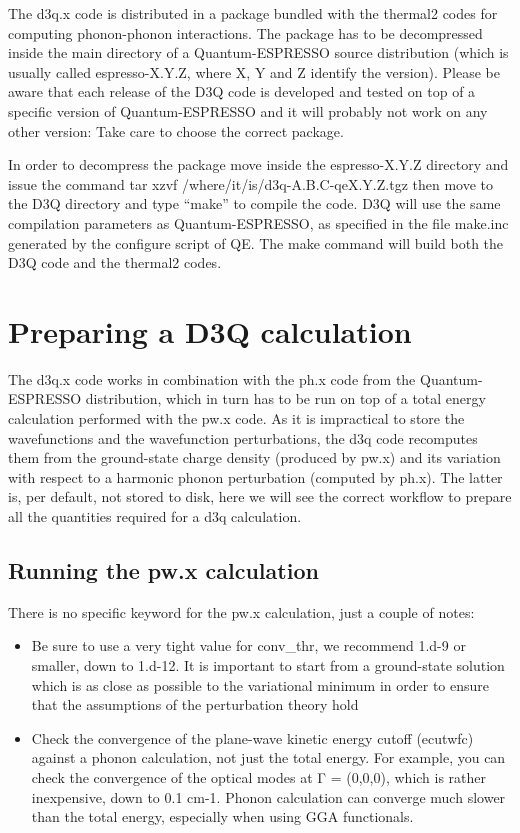 \documentclass[
]{article}
\providecommand{\tightlist}{%
  \setlength{\itemsep}{0pt}\setlength{\parskip}{0pt}}
\begin{document}
The d3q.x code is distributed in a package bundled with the thermal2
codes for computing phonon-phonon interactions. The package has to be
decompressed inside the main directory of a Quantum-ESPRESSO source
distribution (which is usually called espresso-X.Y.Z, where X, Y and Z
identify the version). Please be aware that each release of the D3Q code
is developed and tested on top of a specific version of Quantum-ESPRESSO
and it will probably not work on any other version: Take care to choose
the correct package.

In order to decompress the package move inside the espresso-X.Y.Z
directory and issue the command tar xzvf
/where/it/is/d3q-A.B.C-qeX.Y.Z.tgz then move to the D3Q directory and
type \enquote{make} to compile the code. D3Q will use the same
compilation parameters as Quantum-ESPRESSO, as specified in the file
make.inc generated by the configure script of QE. The make command will
build both the D3Q code and the thermal2 codes.

\hypertarget{preparing-a-d3q-calculation}{%
\section{Preparing a D3Q
calculation}\label{preparing-a-d3q-calculation}}

The d3q.x code works in combination with the ph.x code from the
Quantum-ESPRESSO distribution, which in turn has to be run on top of a
total energy calculation performed with the pw.x code. As it is
impractical to store the wavefunctions and the wavefunction
perturbations, the d3q code recomputes them from the ground-state charge
density (produced by pw.x) and its variation with respect to a harmonic
phonon perturbation (computed by ph.x). The latter is, per default, not
stored to disk, here we will see the correct workflow to prepare all the
quantities required for a d3q calculation.

\hypertarget{running-the-pw.x-calculation}{%
\subsection{Running the pw.x
calculation}\label{running-the-pw.x-calculation}}

There is no specific keyword for the pw.x calculation, just a couple of
notes:

\begin{itemize}
\tightlist
\item
  Be sure to use a very tight value for conv\_thr, we recommend 1.d-9 or
  smaller, down to 1.d-12. It is important to start from a ground-state
  solution which is as close as possible to the variational minimum in
  order to ensure that the assumptions of the perturbation theory hold
\item
  Check the convergence of the plane-wave kinetic energy cutoff
  (ecutwfc) against a phonon calculation, not just the total energy. For
  example, you can check the convergence of the optical modes at Γ =
  (0,0,0), which is rather inexpensive, down to 0.1 cm-1. Phonon
  calculation can converge much slower than the total energy, especially
  when using GGA functionals.
\end{itemize}
\end{document}
